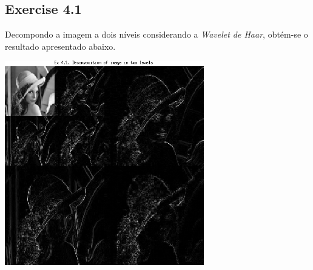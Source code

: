 \documentclass[a4paper]{article}
\begin{document}
\subsection{Exercise 4.1}
\indent \indent Decompondo a imagem a dois níveis considerando a \emph{Wavelet de Haar}, obtém-se o resultado apresentado abaixo.
\begin{center}
	\includegraphics[width=0.65\textwidth]{images/ex_4_1.png}
\end{center}
\end{document}
